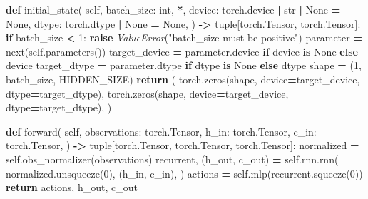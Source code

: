 \documentclass[
  chinese,
  11pt,
  letterpaper,
]{article}
\newenvironment{Shaded}{\begin{snugshade}}{\end{snugshade}}
\newcommand{\BuiltInTok}[1]{#1}
\newcommand{\ControlFlowTok}[1]{\textcolor[rgb]{0.13,0.29,0.53}{\textbf{#1}}}
\newcommand{\DecValTok}[1]{\textcolor[rgb]{0.00,0.00,0.81}{#1}}
\newcommand{\KeywordTok}[1]{\textcolor[rgb]{0.13,0.29,0.53}{\textbf{#1}}}
\newcommand{\NormalTok}[1]{#1}
\newcommand{\OperatorTok}[1]{\textcolor[rgb]{0.81,0.36,0.00}{\textbf{#1}}}
\newcommand{\PreprocessorTok}[1]{\textcolor[rgb]{0.56,0.35,0.01}{\textit{#1}}}
\newcommand{\StringTok}[1]{\textcolor[rgb]{0.31,0.60,0.02}{#1}}
\newcommand{\VariableTok}[1]{\textcolor[rgb]{0.00,0.00,0.00}{#1}}
\renewenvironment{Shaded}{\par\smallskip}{\par\smallskip}
\begin{document}
\begin{Shaded}
\begin{Highlighting}[]
    \KeywordTok{def}\NormalTok{ initial\_state(}
        \VariableTok{self}\NormalTok{,}
\NormalTok{        batch\_size: }\BuiltInTok{int}\NormalTok{,}
        \OperatorTok{*}\NormalTok{,}
\NormalTok{        device: torch.device }\OperatorTok{|} \BuiltInTok{str} \OperatorTok{|} \VariableTok{None} \OperatorTok{=} \VariableTok{None}\NormalTok{,}
\NormalTok{        dtype: torch.dtype }\OperatorTok{|} \VariableTok{None} \OperatorTok{=} \VariableTok{None}\NormalTok{,}
\NormalTok{    ) }\OperatorTok{{-}\textgreater{}} \BuiltInTok{tuple}\NormalTok{[torch.Tensor, torch.Tensor]:}
        \ControlFlowTok{if}\NormalTok{ batch\_size }\OperatorTok{\textless{}} \DecValTok{1}\NormalTok{:}
            \ControlFlowTok{raise} \PreprocessorTok{ValueError}\NormalTok{(}\StringTok{"batch\_size must be positive"}\NormalTok{)}
\NormalTok{        parameter }\OperatorTok{=} \BuiltInTok{next}\NormalTok{(}\VariableTok{self}\NormalTok{.parameters())}
\NormalTok{        target\_device }\OperatorTok{=}\NormalTok{ parameter.device }\ControlFlowTok{if}\NormalTok{ device }\KeywordTok{is} \VariableTok{None} \ControlFlowTok{else}\NormalTok{ device}
\NormalTok{        target\_dtype }\OperatorTok{=}\NormalTok{ parameter.dtype }\ControlFlowTok{if}\NormalTok{ dtype }\KeywordTok{is} \VariableTok{None} \ControlFlowTok{else}\NormalTok{ dtype}
\NormalTok{        shape }\OperatorTok{=}\NormalTok{ (}\DecValTok{1}\NormalTok{, batch\_size, HIDDEN\_SIZE)}
        \ControlFlowTok{return}\NormalTok{ (}
\NormalTok{            torch.zeros(shape, device}\OperatorTok{=}\NormalTok{target\_device, dtype}\OperatorTok{=}\NormalTok{target\_dtype),}
\NormalTok{            torch.zeros(shape, device}\OperatorTok{=}\NormalTok{target\_device, dtype}\OperatorTok{=}\NormalTok{target\_dtype),}
\NormalTok{        )}

    \KeywordTok{def}\NormalTok{ forward(}
        \VariableTok{self}\NormalTok{,}
\NormalTok{        observations: torch.Tensor,}
\NormalTok{        h\_in: torch.Tensor,}
\NormalTok{        c\_in: torch.Tensor,}
\NormalTok{    ) }\OperatorTok{{-}\textgreater{}} \BuiltInTok{tuple}\NormalTok{[torch.Tensor, torch.Tensor, torch.Tensor]:}
\NormalTok{        normalized }\OperatorTok{=} \VariableTok{self}\NormalTok{.obs\_normalizer(observations)}
\NormalTok{        recurrent, (h\_out, c\_out) }\OperatorTok{=} \VariableTok{self}\NormalTok{.rnn.rnn(}
\NormalTok{            normalized.unsqueeze(}\DecValTok{0}\NormalTok{),}
\NormalTok{            (h\_in, c\_in),}
\NormalTok{        )}
\NormalTok{        actions }\OperatorTok{=} \VariableTok{self}\NormalTok{.mlp(recurrent.squeeze(}\DecValTok{0}\NormalTok{))}
        \ControlFlowTok{return}\NormalTok{ actions, h\_out, c\_out}


\end{Highlighting}
\end{Shaded}
\end{document}
